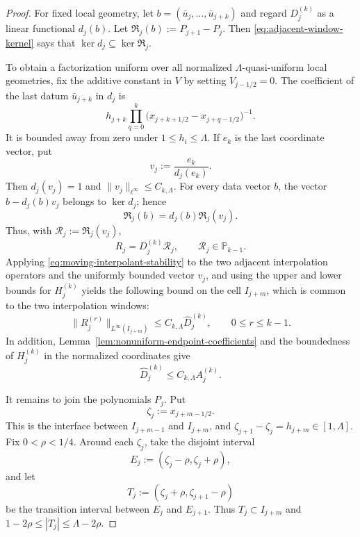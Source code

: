 \documentclass[11pt]{amsart}
\theoremstyle{plain}
\theoremstyle{definition}
\theoremstyle{remark}
\numberwithin{equation}{section}
\theoremstyle{plain}
\begin{document}
\begin{proof}
	For fixed local geometry, let $b=(\bar u_j,\ldots,\bar u_{j+k})$ and regard
	$D_j^{(k)}$ as a linear functional $d_j(b)$.  Let
	$\mathfrak R_j(b):=P_{j+1}-P_j$.  Then
	\eqref{eq:adjacent-window-kernel} says that
	$\ker d_j\subseteq\ker\mathfrak R_j$.

	To obtain a factorization uniform over all normalized
	$\Lambda$-quasi-uniform local geometries, fix the additive constant in
	$V$ by setting $V_{j-1/2}=0$.  The coefficient of the last datum $\bar u_{j+k}$ in $d_j$ is
	\begin{equation}\label{eq:last-datum-coefficient}
		h_{j+k}
		\prod_{q=0}^{k}
		\bigl(x_{j+k+1/2}-x_{j+q-1/2}\bigr)^{-1}.
	\end{equation}
	It is bounded away from zero under $1\le h_i\le\Lambda$.  If $e_k$ is the
	last coordinate vector, put
	\[
		v_j:=\frac{e_k}{d_j(e_k)}.
	\]
	Then $d_j(v_j)=1$ and $\|v_j\|_{\ell^\infty}\le C_{k,\Lambda}$.  For every data vector
	$b$, the vector $b-d_j(b)v_j$ belongs to $\ker d_j$; hence
	\[
		\mathfrak R_j(b)=d_j(b)\mathfrak R_j(v_j).
	\]
	Thus, with $\mathcal R_j:=\mathfrak R_j(v_j)$,
	\begin{equation}\label{eq:adjacent-window-factorization}
		R_j=D_j^{(k)}\mathcal R_j,
		\qquad
		\mathcal R_j\in\mathbb P_{k-1}.
	\end{equation}
	Applying \eqref{eq:moving-interpolant-stability} to the two adjacent
	interpolation operators and the uniformly bounded vector $v_j$, and using
	the upper and lower bounds for $H_j^{(k)}$
	yields the following bound on the cell $I_{j+m}$, which is common to
	the two interpolation windows:
	\begin{equation}\label{eq:adjacent-window-bound}
		\|R_j^{(r)}\|_{L^\infty(I_{j+m})}
		\le C_{k,\Lambda}\widehat D_j^{(k)},
		\qquad 0\le r\le k-1.
	\end{equation}
	In addition, Lemma~\ref{lem:nonuniform-endpoint-coefficients} and the
	boundedness of $H_j^{(k)}$ in the normalized coordinates give
	\begin{equation}\label{eq:normalized-difference-by-amplitude}
		\widehat D_j^{(k)}
		\le C_{k,\Lambda}A_j^{(k)}.
	\end{equation}
	
	It remains to join the polynomials $P_j$.  Put
	\[
	\zeta_j:=x_{j+m-1/2}.
	\]
	This is the interface between $I_{j+m-1}$ and $I_{j+m}$, and
	$\zeta_{j+1}-\zeta_j=h_{j+m}\in[1,\Lambda]$.  Fix $0<\rho<1/4$.
	Around each $\zeta_j$, take the disjoint interval
	\[
	E_j:=(\zeta_j-\rho,\zeta_j+\rho),
	\]
	and let
	\[
	T_j:=(\zeta_j+\rho,\zeta_{j+1}-\rho)
	\]
	be the transition interval between $E_j$ and $E_{j+1}$.  Thus
	$T_j\subset I_{j+m}$ and
	$1-2\rho\le|T_j|\le\Lambda-2\rho$.
	

\end{proof}
\end{document}
